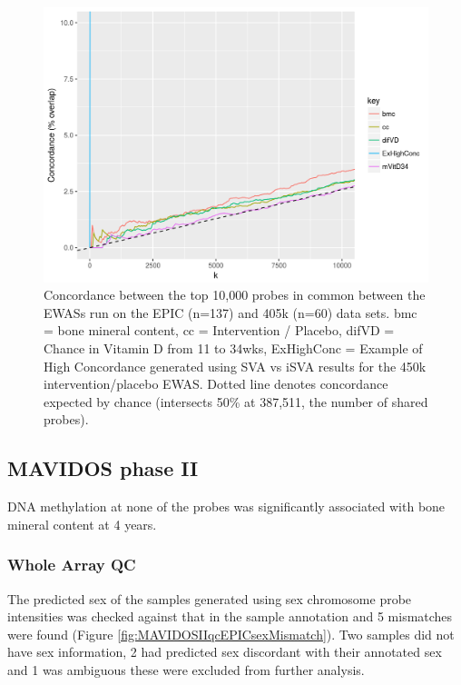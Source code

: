 \documentclass[
]{book}
\begin{document}
\begin{figure}

{\centering \includegraphics[width=0.8\linewidth]{figs/EPIC450kEWASconcordMAVIDOSMonApr162018zoom} 

}

\caption{Concordance between the top 10,000 probes in common between the EWASs run on the EPIC (n=137) and 405k (n=60) data sets. bmc = bone mineral content, cc = Intervention / Placebo, difVD = Chance in Vitamin D from 11 to 34wks, ExHighConc = Example of High Concordance generated using SVA vs iSVA results for the 450k intervention/placebo EWAS. Dotted line denotes concordance expected by chance (intersects 50\% at 387,511, the number of shared probes).}\label{fig:EPIC450kEWASconcordMAVIDOSMonApr162018zoom}
\end{figure}



\hypertarget{mavidos-phase-ii}{%
\subsection{MAVIDOS phase II}\label{mavidos-phase-ii}}

DNA methylation at none of the probes was significantly associated with bone mineral content at 4 years.

\hypertarget{whole-array-qc-1}{%
\subsubsection{Whole Array QC}\label{whole-array-qc-1}}

The predicted sex of the samples generated using sex chromosome probe intensities was checked against that in the sample annotation and 5 mismatches were found (Figure \ref{fig:MAVIDOSIIqcEPICsexMismatch}).
Two samples did not have sex information, 2 had predicted sex discordant with their annotated sex and 1 was ambiguous these were excluded from further analysis.
\end{document}
